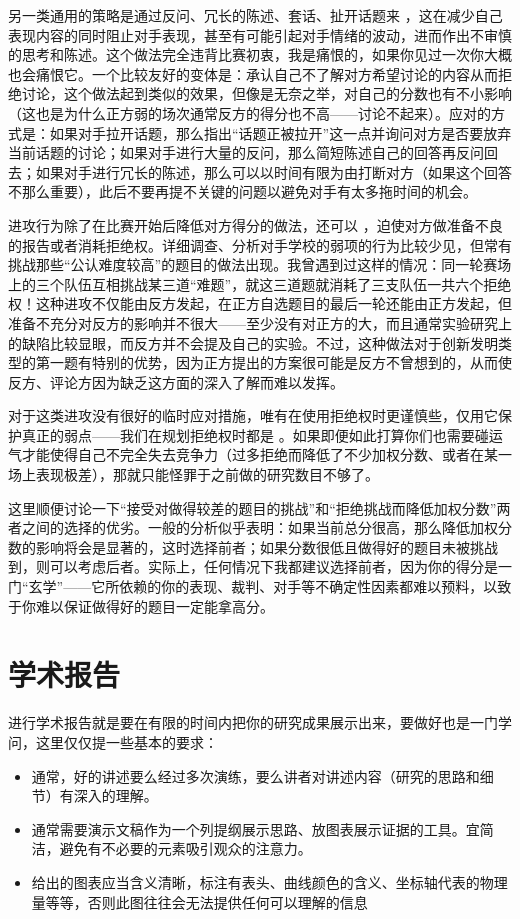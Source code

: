 \documentclass[a4paper,10pt,english]{sphinxmanual}
\begin{document}
另一类通用的策略是通过反问、冗长的陈述、套话、扯开话题来  ，这在减少自己表现内容的同时阻止对手表现，甚至有可能引起对手情绪的波动，进而作出不审慎的思考和陈述。这个做法完全违背比赛初衷，我是痛恨的，如果你见过一次你大概也会痛恨它。一个比较友好的变体是：承认自己不了解对方希望讨论的内容从而拒绝讨论，这个做法起到类似的效果，但像是无奈之举，对自己的分数也有不小影响（这也是为什么正方弱的场次通常反方的得分也不高——讨论不起来）。应对的方式是：如果对手拉开话题，那么指出“话题正被拉开”这一点并询问对方是否要放弃当前话题的讨论；如果对手进行大量的反问，那么简短陈述自己的回答再反问回去；如果对手进行冗长的陈述，那么可以以时间有限为由打断对方（如果这个回答不那么重要），此后不要再提不关键的问题以避免对手有太多拖时间的机会。

进攻行为除了在比赛开始后降低对方得分的做法，还可以  ，迫使对方做准备不良的报告或者消耗拒绝权。详细调查、分析对手学校的弱项的行为比较少见，但常有挑战那些“公认难度较高”的题目的做法出现。我曾遇到过这样的情况：同一轮赛场上的三个队伍互相挑战某三道“难题”，就这三道题就消耗了三支队伍一共六个拒绝权！这种进攻不仅能由反方发起，在正方自选题目的最后一轮还能由正方发起，但准备不充分对反方的影响并不很大——至少没有对正方的大，而且通常实验研究上的缺陷比较显眼，而反方并不会提及自己的实验。不过，这种做法对于创新发明类型的第一题有特别的优势，因为正方提出的方案很可能是反方不曾想到的，从而使反方、评论方因为缺乏这方面的深入了解而难以发挥。

对于这类进攻没有很好的临时应对措施，唯有在使用拒绝权时更谨慎些，仅用它保护真正的弱点——我们在规划拒绝权时都是  。如果即便如此打算你们也需要碰运气才能使得自己不完全失去竞争力（过多拒绝而降低了不少加权分数、或者在某一场上表现极差），那就只能怪罪于之前做的研究数目不够了。

这里顺便讨论一下“接受对做得较差的题目的挑战”和“拒绝挑战而降低加权分数”两者之间的选择的优劣。一般的分析似乎表明：如果当前总分很高，那么降低加权分数的影响将会是显著的，这时选择前者；如果分数很低且做得好的题目未被挑战到，则可以考虑后者。实际上，任何情况下我都建议选择前者，因为你的得分是一门“玄学”——它所依赖的你的表现、裁判、对手等不确定性因素都难以预料，以致于你难以保证做得好的题目一定能拿高分。


\section{学术报告}
\label{\detokenize{6. Tournament:id13}}
进行学术报告就是要在有限的时间内把你的研究成果展示出来，要做好也是一门学问，这里仅仅提一些基本的要求：
\begin{itemize}
\item {} 
通常，好的讲述要么经过多次演练，要么讲者对讲述内容（研究的思路和细节）有深入的理解。

\item {} 
通常需要演示文稿作为一个列提纲展示思路、放图表展示证据的工具。宜简洁，避免有不必要的元素吸引观众的注意力。

\item {} 
给出的图表应当含义清晰，标注有表头、曲线颜色的含义、坐标轴代表的物理量等等，否则此图往往会无法提供任何可以理解的信息

\end{itemize}
\end{document}
